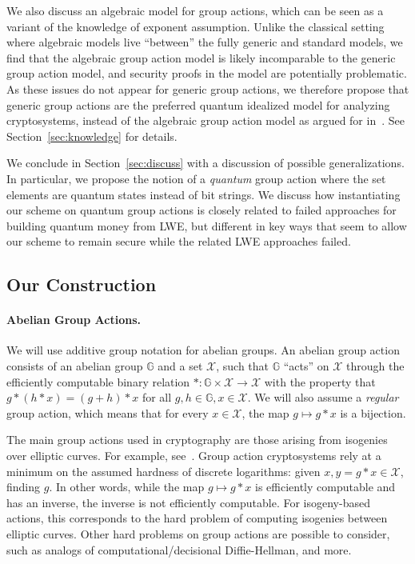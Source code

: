 \documentclass{article}\usepackage[a4paper,margin=20mm]{geometry}
\numberwithin{theorem}{section}
\numberwithin{equation}{section}
\newcommand{\G}{\mathbb{G}}
\newcommand{\Xs}{{\mathcal{X}}}
\begin{document}
We also discuss an algebraic model for group actions, which can be seen as a variant of the knowledge of exponent assumption. Unlike the classical setting where algebraic models live ``between'' the fully generic and standard models, we find that the algebraic group action model is likely incomparable to the generic group action model, and security proofs in the model are potentially problematic. As these issues do not appear for generic group actions, we therefore propose that generic group actions are the preferred quantum idealized model for analyzing cryptosystems, instead of the algebraic group action model as argued for in~\cite{PKC:DHKKLR23}. See Section~\ref{sec:knowledge} for details.

We conclude in Section~\ref{sec:discuss} with a discussion of possible generalizations. In particular, we propose the notion of a \emph{quantum} group action where the set elements are quantum states instead of bit strings. We discuss how instantiating our scheme on quantum group actions is closely related to failed approaches for building quantum money from LWE, but different in key ways that seem to allow our scheme to remain secure while the related LWE approaches failed.

\subsection{Our Construction}\label{sec:constroverview}

\paragraph{Abelian Group Actions.} We will use additive group notation for abelian groups. An abelian group action consists of an abelian group $\G$ and a set $\Xs$, such that $\G$ ``acts'' on $\Xs$ through the efficiently computable binary relation $*:\G\times\Xs\rightarrow\Xs$ with the property that $g*(h*x)=(g+h)*x$ for all $g,h\in\G,x\in\Xs$. We will also assume a \emph{regular} group action, which means that for every $x\in\Xs$, the map $g\mapsto g*x$ is a bijection. 

The main group actions used in cryptography are those arising from isogenies over elliptic curves. For example, see~\cite{EPRINT:Couveignes06,EPRINT:RosSto06,AC:CLMPR18,AC:BeuKleVer19,PKC:DFKLMP23}. %
Group action cryptosystems rely at a minimum on the assumed hardness of discrete logarithms: given $x,y=g*x\in\Xs$, finding $g$. In other words, while the map $g\mapsto g*x$ is efficiently computable and has an inverse, the inverse is not efficiently computable. For isogeny-based actions, this corresponds to the hard problem of computing isogenies between elliptic curves. Other hard problems on group actions are possible to consider, such as analogs of computational/decisional Diffie-Hellman, and more.
\end{document}
